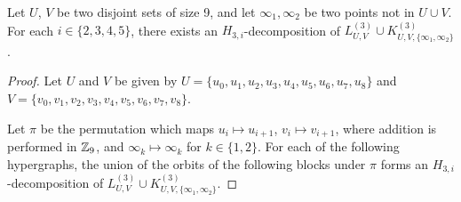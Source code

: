 \begin{subappendices}

\begin{example} \label{eg:H_3i-l99-k992}
Let $U$, $V$ be two disjoint sets of size 9, and let $\infty_1, \infty_2$ be two points not in $U \cup V$.
For each $i \in \{2,3,4,5\}$, there exists an $H_{3,i}$-decomposition of $L_{U,V}^{(3)} \cup K_{U,V,\{\infty_1, \infty_2\}}^{(3)}$.
\end{example}

\begin{proof}
Let $U$ and $V$ be given by
    $U = \{u_0, u_1, u_2, u_3, u_4, u_5, u_6, u_7, u_8\}$ and
    $V = \{v_0, v_1, v_2, v_3, v_4, v_5, v_6, v_7, v_8\}$.

Let $\pi$ be the permutation which maps $u_i \mapsto u_{i+1}$, $v_i \mapsto v_{i+1}$, where addition is performed in $\mathbb{Z}_9$, and $\infty_k \mapsto \infty_k$ for $k \in \{1,2\}$.
For each of the following hypergraphs, the union of the orbits of the following blocks under $\pi$ forms an $H_{3,i}$-decomposition of $L_{U,V}^{(3)} \cup K_{U,V,\{\infty_1, \infty_2\}}^{(3)}$.


\end{proof}
\end{subappendices}
